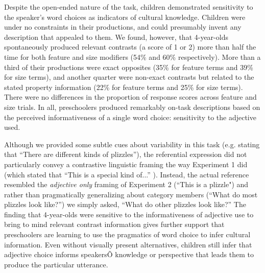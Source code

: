 \documentclass[man]{apa2}
\begin{document}
Despite the open-ended nature of the task, children demonstrated sensitivity to the speaker's word choices as indicators of cultural knowledge.  Children were under no constraints in their productions, and could presumably invent any description that appealed to them.  We found, however, that 4-year-olds spontaneously produced relevant contrasts (a score of 1 or 2) more than half the time for both feature and size modifiers (54\% and 60\% respectively).  More than a third of their productions were exact opposites (35\% for feature terms and 39\% for size terms), and another quarter were non-exact contrasts but related to the stated property information (22\% for feature terms and 25\% for size terms). There were no differences in the proportion of response scores across feature and size trials. In all, preschoolers produced remarkably on-task descriptions based on the perceived informativeness of a single word choice: sensitivity to the adjective used.  

Although we provided some subtle cues about variability in this task (e.g. stating that ``There are different kinds of plizzles''), the referential expression did not particularly convey a contrastive linguistic framing the way Experiment 1 did (which stated that ``This is a special kind of...'' ).  Instead, the actual reference resembled the \emph{adjective only} framing of Experiment 2 (``This is a plizzle") and rather than pragmatically generalizing about category members (``What do most plizzles look like?'') we simply asked, ``What do other plizzles look like?''  The finding that 4-year-olds were sensitive to the informativeness of adjective use to bring to mind relevant contrast information gives further support that preschoolers are learning to use the pragmatics of word choice to infer cultural information.  Even without visually present alternatives, children still infer that adjective choice informs speakersÕ knowledge or perspective that leads them to produce the particular utterance.  
\end{document}
